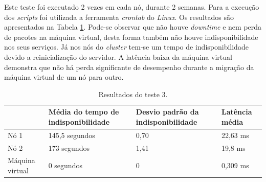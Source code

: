 
Este teste foi executado 2 vezes em cada nó, durante 2 semanas. Para a execução dos \textit{scripts} foi utilizada a ferramenta 
\textit{crontab} do \textit{Linux}. Os resultados são apresentados na Tabela \ref{tab:teste3resultados}.
Pode-se observar que não houve \textit{downtime} e nem perda de pacotes na máquina virtual, desta forma também não houve indisponibilidade nos 
seus serviços. Já nos nós do \textit{cluster} tem-se um tempo de indisponibilidade devido a reinicialização do servidor.
A latência baixa da máquina virtual demonstra que não há perda significante de desempenho durante a migração da máquina virtual de um nó para outro.


\begin{table}[h!]
\caption{Resultados do teste 3.}
\label{tab:teste3resultados}
\begin{center}
\begin{tabular}{|l|p{4cm}|p{4cm}|l|}\hline
 & \textbf{Média do tempo de indisponibilidade} & \textbf{Desvio padrão da indisponibilidade} & \textbf{Latência média} \\\hline
Nó 1 & 145,5 segundos & 0,70 & 22,63 ms \\\hline
Nó 2 & 173 segundos & 1,41 & 19,8 ms \\\hline
Máquina virtual & 0 segundos & 0 & 0,309 ms \\\hline
\end{tabular}
\end{center}
\end{table}

